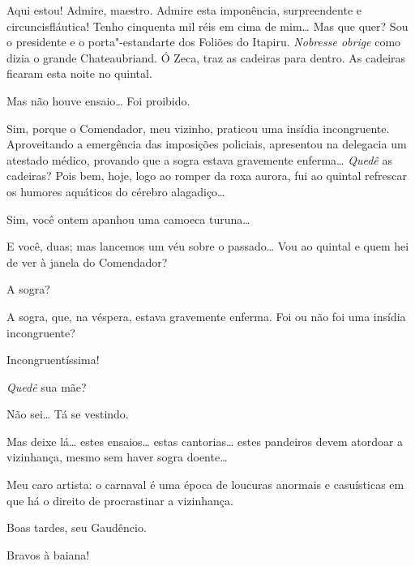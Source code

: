  Aqui estou! Admire, maestro. Admire esta imponência,
surpreendente e circuncisfláutica! Tenho cinquenta mil réis em cima de mim\ldots{} 
Mas que quer? Sou o presidente e o porta"-estandarte dos Foliões do
Itapiru. \textit{Nobresse obrige} como dizia o grande
Chateaubriand.  Ó Zeca, traz as cadeiras para dentro.  As cadeiras ficaram esta noite no quintal.

 Mas não houve ensaio\ldots{}  Foi proibido.

 Sim, porque o Comendador, meu vizinho, praticou uma
insídia incongruente.  Aproveitando a emergência das imposições policiais,
apresentou na delegacia um atestado médico, provando que a sogra estava
gravemente enferma\ldots{}  \textit{Quedê} as
cadeiras? 
  Pois bem, hoje, logo ao romper
da roxa aurora, fui ao quintal refrescar os humores aquáticos do cérebro
alagadiço\ldots{}

 Sim, você ontem apanhou uma camoeca turuna\ldots{}

 E você, duas; mas lancemos um véu sobre o passado\ldots{} Vou ao
quintal e quem hei de ver à janela do Comendador?

 A sogra?

 A sogra, que, na véspera, estava gravemente enferma. Foi
ou não foi uma insídia incongruente?

 Incongruentíssima!

  \textit{Quedê} sua mãe?

 Não sei\ldots{} Tá se vestindo. 

 Mas deixe lá\ldots{} estes ensaios\ldots{} estas cantorias\ldots{} estes
pandeiros devem atordoar a vizinhança, mesmo sem haver sogra doente\ldots{}

 Meu caro artista: o carnaval é uma época de loucuras
anormais e casuísticas em que há o direito de procrastinar a vizinhança.

\vfil{}



  Boas tardes, seu Gaudêncio.

 Bravos à baiana!

